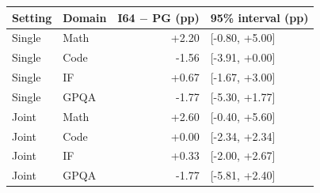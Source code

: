 \begin{tabular}{llrl}
\toprule
Setting & Domain & I64 $-$ PG (pp) & 95\% interval (pp) \\
\midrule
Single & Math & +2.20 & [-0.80, +5.00] \\
Single & Code & -1.56 & [-3.91, +0.00] \\
Single & IF & +0.67 & [-1.67, +3.00] \\
Single & GPQA & -1.77 & [-5.30, +1.77] \\
Joint & Math & +2.60 & [-0.40, +5.60] \\
Joint & Code & +0.00 & [-2.34, +2.34] \\
Joint & IF & +0.33 & [-2.00, +2.67] \\
Joint & GPQA & -1.77 & [-5.81, +2.40] \\
\bottomrule
\end{tabular}
